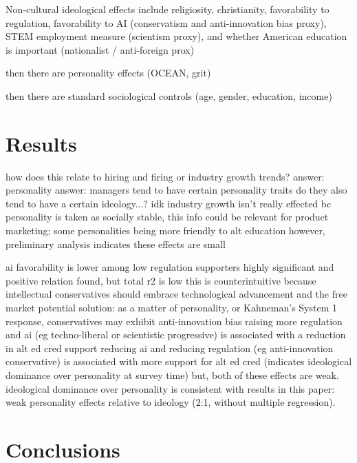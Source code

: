 \documentclass[review]{elsarticle}
\begin{document}
Non-cultural ideological effects include religiosity,
christianity,
favorability to regulation,
favorability to AI (conservatism and anti-innovation bias proxy),
STEM employment measure (scientism proxy),
and whether American education is important (nationalist / anti-foreign prox)

then there are personality effects (OCEAN, grit)

then there are standard sociological controls (age, gender, education, income)

\section{Results}


how does this relate to hiring and firing or industry growth trends?
answer: personality answer: managers tend to have certain personality traits
do they also tend to have a certain ideology...? idk
industry growth isn't really effected bc personality is taken as socially stable,
this info could be relevant for product marketing; some personalities being more friendly to alt education
however, preliminary analysis indicates these effects are small

%

ai favorability is lower among low regulation supporters
highly significant and positive relation found, but total r2 is low
this is counterintuitive because intellectual conservatives should embrace technological advancement and the free market
potential solution: as a matter of personality, or Kahneman's System 1 response, conservatives may exhibit anti-innovation bias
raising more regulation and ai (eg techno-liberal or scientistic progressive) is associated with a reduction in alt ed cred support
reducing ai and reducing regulation (eg anti-innovation conservative) is associated with more support for alt ed cred (indicates ideological dominance over personality at survey time)
but, both of these effects are weak.
ideological dominance over personality is consistent with results in this paper: weak personality effects relative to ideology (2:1, without multiple regression).

\section{Conclusions}




\end{document}
